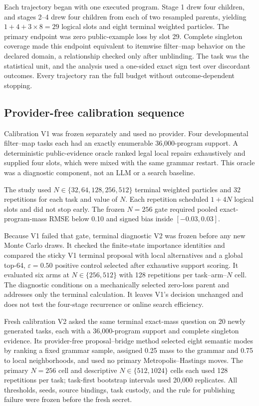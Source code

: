 \documentclass[twoside,11pt]{article}
\begin{document}
Each trajectory began with one executed program. Stage 1 drew four children,
and stages 2--4 drew four children from each of two resampled parents, yielding
$1+4+3\times8=29$ logical slots and eight terminal weighted particles. The
primary endpoint was zero public-example loss by slot 29. Complete singleton
coverage made this endpoint equivalent to itemwise filter--map behavior on the
declared domain, a relationship checked only after unblinding. The task was the
statistical unit, and the analysis used a one-sided exact sign test over
discordant outcomes. Every trajectory ran the full budget without
outcome-dependent stopping.

\subsection{Provider-free calibration sequence}
\label{sec:calibration-sequence}

Calibration V1 was frozen separately and used no provider. Four developmental
filter--map tasks each had an exactly enumerable 36,000-program support. A
deterministic public-evidence oracle ranked legal local repairs exhaustively and
supplied four slots, which were mixed with the same grammar restart. This oracle
was a diagnostic component, not an LLM or a search baseline.

The study used $N\in\{32,64,128,256,512\}$ terminal weighted particles and 32
repetitions for each task and value of $N$. Each repetition scheduled $1+4N$
logical slots and did not stop early. The frozen $N=256$ gate required pooled
exact-program-mass RMSE below 0.10 and signed bias inside $[-0.03,0.03]$.

Because V1 failed that gate, terminal diagnostic V2 was frozen before any new
Monte Carlo draws. It checked the finite-state importance identities and
compared the sticky V1 terminal proposal with local alternatives and a global
top-64, $\varepsilon=0.50$ positive control selected after exhaustive support
scoring. It evaluated six arms at
$N\in\{256,512\}$ with 128 repetitions per task--arm--$N$ cell. The diagnostic
conditions on a mechanically selected zero-loss parent and addresses only the
terminal calculation. It leaves V1's decision unchanged and does not test the
four-stage recurrence or online search efficiency.

Fresh calibration V2 asked the same terminal exact-mass question on 20 newly
generated tasks, each with a 36,000-program support and complete singleton
evidence. Its provider-free proposal--bridge method selected eight semantic
modes by ranking a fixed grammar sample, assigned 0.25 mass to the grammar and
0.75 to local neighborhoods, and used no primary Metropolis--Hastings moves.
The primary $N=256$ cell and descriptive $N\in\{512,1024\}$ cells each used
128 repetitions per task; task-first bootstrap intervals used 20,000
replicates. All thresholds, seeds, source bindings, task custody, and the rule
for publishing failure were frozen before the fresh secret.
\end{document}

